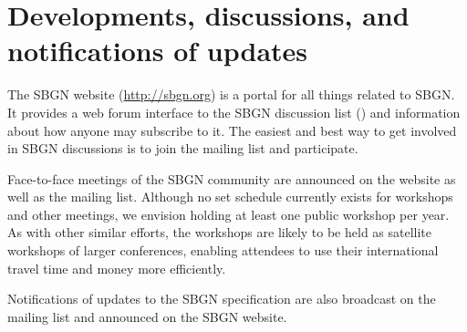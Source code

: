 \section{Developments, discussions, and notifications of updates}
\label{sec:discussions}

The SBGN website (\url{http://sbgn.org}) is a portal for all things related to SBGN.  It provides a web forum interface to the SBGN discussion list () and information about how anyone may subscribe to it.  The easiest and best way to get involved in SBGN discussions is to join the mailing list and participate.

Face-to-face meetings of the SBGN community are announced on the website as well as the mailing list.  Although no set schedule currently exists for workshops and other meetings, we envision holding at least one public workshop per year.  As with other similar efforts, the workshops are likely to be held as satellite workshops of larger conferences, enabling attendees to use their international travel time and money more efficiently.

Notifications of updates to the SBGN specification are also broadcast on the mailing list and announced on the SBGN website.
